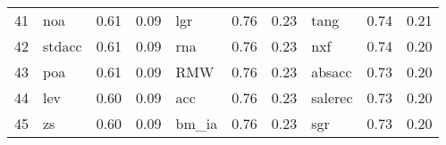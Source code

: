 \documentclass[12pt]{article}
\begin{document}
\begin{landscape}
\begin{footnotesize}
\begin{longtable}{l|lcc|lcc|lcc}
			41                    & noa                         & 0.61                                                                                 & 0.09                            & lgr                         & 0.76                                                                                 & 0.23                            & tang                        & 0.74                                                                                 & 0.21                           \\
			42                    & stdacc                      & 0.61                                                                                 & 0.09                            & rna                         & 0.76                                                                                 & 0.23                            & nxf                         & 0.74                                                                                 & 0.20                           \\
			43                    & poa                         & 0.61                                                                                 & 0.09                            & RMW                         & 0.76                                                                                 & 0.23                            & absacc                      & 0.73                                                                                 & 0.20                           \\
			44                    & lev                         & 0.60                                                                                 & 0.09                            & acc                         & 0.76                                                                                 & 0.23                            & salerec                     & 0.73                                                                                 & 0.20                           \\
			45                    & zs                          & 0.60                                                                                 & 0.09                            & bm\_ia                      & 0.76                                                                                 & 0.23                            & sgr                         & 0.73                                                                                 & 0.20                           \\

\end{longtable}
\end{footnotesize}
\end{landscape}
\end{document}
